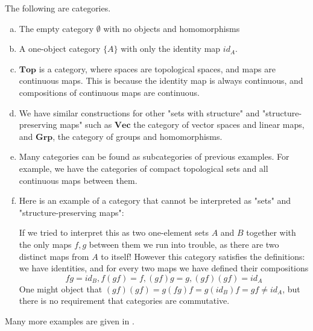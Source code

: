 \begin{example}
The following are categories.
\begin{enumerate}[(a)]

\item The empty category $\emptyset$ with no objects and homomorphisms
\item A one-object category $\{A\}$ with only the identity map $id_A$.

\item $\mathbf{Top}$ is a category, where spaces are topological spaces, and maps are continuous maps. This is because the identity map is always continuous, and compositions of continuous maps are continuous.

\item We have similar constructions for other "sets with structure" and "structure-preserving maps" such as $\mathbf{Vec}$ the category of vector spaces and linear maps, and $\mathbf{Grp}$, the category of groups and homomorphisms.
\item Many categories can be found as subcategories of previous examples. For example, we have the categories of compact topological sets and all continuous maps between them.
\item Here is an example of a category that cannot be interpreted as "sets" and "structure-preserving maps": 
If we tried to interpret this as two one-element sets $A$ and $B$ together with the only maps $f,g$ between them we run into trouble, as there are two distinct maps from $A$ to itself! However this category satisfies the definitions: we have identities, and for every two maps we have defined their compositions
$$fg=id_B, f(gf)=f,(gf)g=g,(gf)(gf)=id_A$$
One might object that $(gf)(gf)=g(fg)f=g(id_B)f=gf\neq id_A$, but there is no requirement that categories are commutative.
\end{enumerate}\end{example}
Many more examples are given in \cite{Leinster}.

